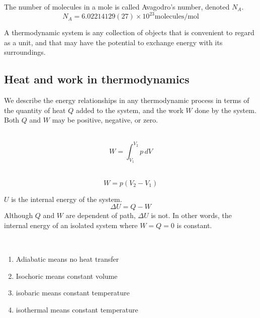 \documentclass[nobib,notoc]{tufte-handout}
\begin{document}
\begin{defi}
	The number of molecules in a mole is called Avagodro's number, denoted \(N_A\).
	\begin{equation*}
		N_A=6.02214129(27)\times 10^{23}\text{molecules/mol}
	\end{equation*}
\end{defi}
\begin{defi}
	A thermodynamic system is any collection of objects that is convenient to regard as a unit, and that may have the potential to exchange energy with its surroundings.
\end{defi}
\subsection{Heat and work in thermodynamics}
We describe the energy relationships in any thermodynamic process in terms of the quantity of heat \(Q\) added to the system, and the work \(W\) done by the system. Both \(Q\) and \(W\) may be positive, negative, or zero.
\begin{defi}
	\,
	\begin{equation*}
		W=\int_{V_1}^{V_2}p\,dV
	\end{equation*}
\end{defi}
\begin{defi}
	\,
	\begin{equation*}
		W=p(V_2-V_1)
	\end{equation*}
\end{defi}
\begin{defi}
	\(U\) is the internal energy of the system.
	\begin{equation*}
		\Delta U=Q-W
	\end{equation*}
	Although \(Q\) and \(W\) are dependent of path, \(\Delta U\) is not. In other words, the internal energy of an isolated system where \(W=Q=0\) is constant.
\end{defi}
\begin{defi}
	\,
	\begin{enumerate}
		\item Adiabatic means no heat transfer
		\item Isochoric means constant volume
		\item isobaric means constant temperature
		\item isothermal means constant temperature
	\end{enumerate}
\end{defi}
\end{document}
